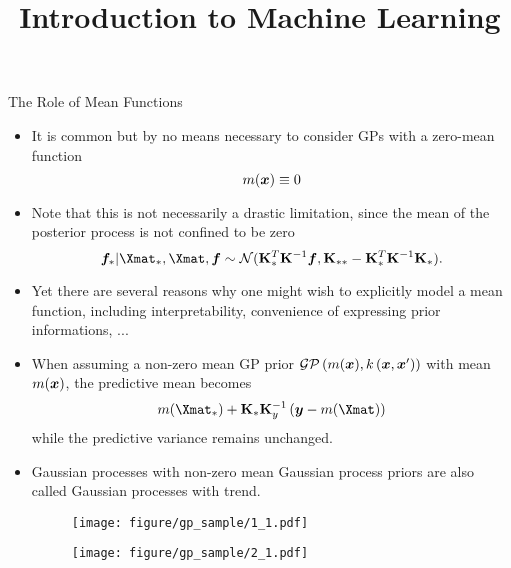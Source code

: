 




\newcommand{\titlefigure}{figure/gp_sample/2_4.pdf} %
\newcommand{\learninggoals}{
  \item Trends can be modeled via specification of the mean function 
}

\title{Introduction to Machine Learning}
\date{}





\begin{vbframe}{The Role of Mean Functions}

\begin{itemize}
  \item It is common but by no means necessary to consider GPs with a zero-mean function 
  $$
    m(\bm{x}) \equiv 0
  $$
  \item Note that this is not necessarily a drastic limitation, since the mean of the posterior process is not confined to be zero 
  $$
    \bm{f}_* | \Xmat_*, \Xmat, \bm{f} \sim \mathcal{N}(\Kmat_{*}^{T}\Kmat^{-1}\bm{f}, \Kmat_{**} - \Kmat_*^T \Kmat ^{-1}\Kmat_*).
  $$
  \item Yet there are several reasons why one might wish to explicitly model a mean function, including interpretability, convenience of expressing prior informations, ... 
  \item When assuming a non-zero mean GP prior $\mathcal{GP}\left(m(\bm{x}), k\left(\bm{x}, \bm{x}^{\prime} \right) \right)$ with mean $m(\bm{x})$, the predictive mean becomes 
  $$
    m(\Xmat_*) + \Kmat_*\Kmat_y^{-1}\left(\bm{y} - m(\Xmat)\right)
  $$
  while the predictive variance remains unchanged. 
  
  \framebreak
  
  \item Gaussian processes with non-zero mean Gaussian process priors are also called Gaussian processes with trend.  
\vspace{.3cm}

\begin{figure}
\texttt{[image: figure/gp\_sample/1\_1.pdf]}
\end{figure}

\framebreak


\begin{figure}
\texttt{[image: figure/gp\_sample/2\_1.pdf]}
\end{figure}


\end{itemize}
\end{vbframe}
